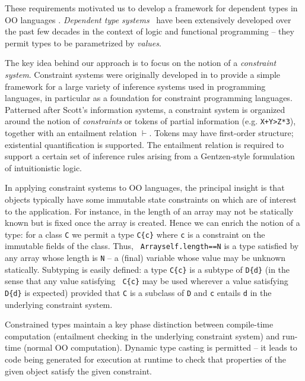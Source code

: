 These requirements motivated us to develop a framework for dependent
types in OO languages \cite{x10-oopsla08}.  {\em Dependent type
systems}~\cite{dependent-types,xi99dependent,ocrz-ecoop03,aspinall-attapl,cayenne,epigram-matter,calc-constructions}
have been extensively developed over the past few decades in the
context of logic and functional programming -- they permit types to be
parametrized by {\em values}.

The key idea behind our approach is to focus on the notion of a {\em
constraint system}. Constraint systems were originally developed in
\cite{cccc} to provide a simple framework for a large variety of
inference systems used in programming languages, in particular as a
foundation for constraint programming languages.  Patterned after
Scott's information systems\cite{info-sys}, a constraint system is
organized around the notion of {\em constraints} or tokens of partial
information (e.g.{} {\tt X+Y>Z*3}), together with an entailment
relation $\vdash$.  Tokens may have first-order structure; existential
quantification is supported. The entailment relation is required to
support a certain set of inference rules arising from a Gentzen-style
formulation of intuitionistic logic.

In applying constraint systems to OO languages, the principal insight
is that objects typically have some immutable state constraints on
which are of interest to the application.  For instance, in \Java{}
the length of an array may not be statically known but is fixed once
the array is created. Hence we can enrich the notion of a type: for a
class {\tt C} we permit a type {\tt C\{c\}} where {\tt c} is a
constraint on the immutable fields of the class. Thus, {\tt
Array{self.length==N}} is a type satisfied by any array whose length
is {\tt N} -- a (final) variable whose value may be unknown
statically. Subtyping is easily defined: a type {\tt C\{c\}} is a
subtype of {\tt D\{d\}} (in the sense that any value satisfying {\tt
C\{c\}} may be used wherever a value satisfying {\tt D\{d\}} is
expected) provided that {\tt C} is a subclass of {\tt D} and {\tt c}
entails {\tt d} in the underlying constraint system.

Constrained types maintain a key phase distinction between
compile-time computation (entailment checking in the underlying
constraint system) and run-time (normal OO computation).  Dynamic type
casting is permitted -- it leads to code being generated for execution
at runtime to check that properties of the given object satisfy the
given constraint. 


